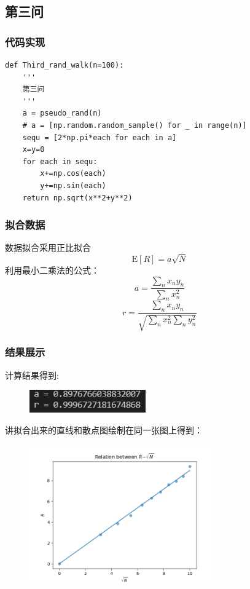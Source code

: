 \documentclass[a4paper]{ctexart}
\begin{document}
\subsection{第三问}
\subsubsection{代码实现}
\begin{lstlisting}
def Third_rand_walk(n=100):
	'''
	第三问
	'''
	a = pseudo_rand(n)
	# a = [np.random.random_sample() for _ in range(n)]
	sequ = [2*np.pi*each for each in a]
	x=y=0
	for each in sequ:
		x+=np.cos(each)
		y+=np.sin(each)
	return np.sqrt(x**2+y**2)
\end{lstlisting}
\subsubsection{拟合数据}
数据拟合采用正比拟合
\begin{equation}
\mathrm{E}[R]=a \sqrt{N}
\end{equation}
利用最小二乘法的公式：
\begin{equation}
a=\frac{\sum_{n} x_{n} y_{n}}{\sum_{n} x_{n}^{2}}
\end{equation}
\begin{equation}
r=\frac{\sum_{n} x_{n} y_{n}}{\sqrt{\sum_{n} x_{n}^{2} \sum_{n} y_{n}^{2}}}
\end{equation}
\subsubsection{结果展示}
计算结果得到:

\begin{figure}[hbt]
	\centering
	\includegraphics[width=5cm]{./fig/walk_res.png}
\end{figure}
讲拟合出来的直线和散点图绘制在同一张图上得到：
\begin{figure}[hbt]
	\centering
	\includegraphics[width=8cm]{./fig/Walk_1.png}
\end{figure}
\end{document}
